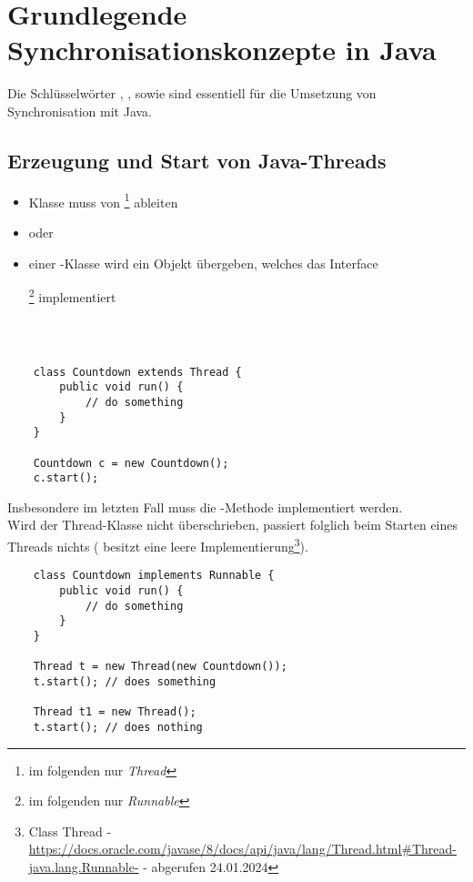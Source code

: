 \section{Grundlegende Synchronisationskonzepte in Java}

Die Schlüsselwörter , ,  sowie  sind essentiell für die Umsetzung von Synchronisation mit Java.

\subsection{Erzeugung und Start von Java-Threads}

\begin{itemize}
    \item Klasse muss von \footnote{im folgenden nur \textit{Thread}} ableiten
    \item[] oder
    \item einer -Klasse wird ein Objekt übergeben, welches das Interface
    \begin{center}\end{center}\footnote{im folgenden nur \textit{Runnable}} implementiert
\end{itemize}\\

\begin{verbatim}

    class Countdown extends Thread {
        public void run() {
            // do something
        }
    }

    Countdown c = new Countdown();
    c.start();
\end{verbatim}


Insbesondere im letzten Fall muss die -Methode implementiert werden.\\

\noindent
Wird  der Thread-Klasse nicht überschrieben, passiert folglich beim Starten eines Threads nichts ( besitzt eine leere Implementierung\footnote{
    Class Thread - \url{https://docs.oracle.com/javase/8/docs/api/java/lang/Thread.html#Thread-java.lang.Runnable-} - abgerufen 24.01.2024
}).

\begin{verbatim}
    class Countdown implements Runnable {
        public void run() {
            // do something
        }
    }

    Thread t = new Thread(new Countdown());
    t.start(); // does something

    Thread t1 = new Thread();
    t.start(); // does nothing
\end{verbatim}


